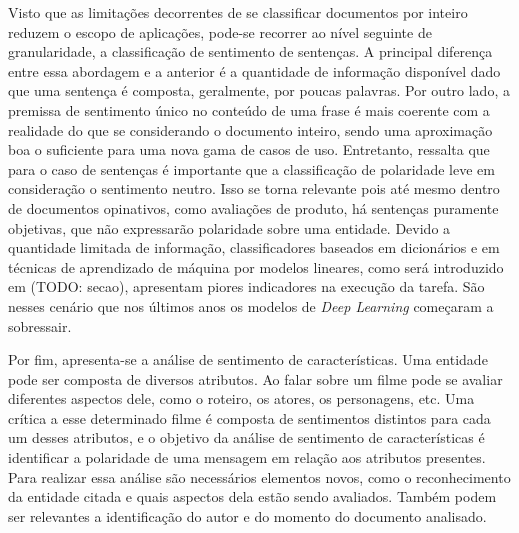 Visto que as limitações decorrentes de se classificar documentos por inteiro
reduzem o escopo de aplicações, pode-se recorrer ao nível seguinte de
granularidade, a classificação de sentimento de sentenças.
A principal diferença entre essa abordagem e a anterior é a quantidade de
informação disponível dado que uma sentença é composta, geralmente, por poucas
palavras.
Por outro lado, a premissa de sentimento único no conteúdo de uma frase é mais
coerente com a realidade do que se considerando o documento inteiro, sendo uma
aproximação boa o suficiente para uma nova gama de casos de uso.
Entretanto, \citet{liu15} ressalta que para o caso de sentenças é importante que
a classificação de polaridade leve em consideração o sentimento neutro.
Isso se torna relevante pois até mesmo dentro de documentos opinativos, como
avaliações de produto, há sentenças puramente objetivas, que não expressarão
polaridade sobre uma entidade.
Devido a quantidade limitada de informação, classificadores baseados em
dicionários e em técnicas de aprendizado de máquina por modelos lineares,
como será introduzido em (TODO: secao), apresentam piores indicadores na
execução da tarefa.
São nesses cenário que nos últimos anos os modelos de \textit{Deep Learning}
começaram a sobressair.

Por fim, apresenta-se a análise de sentimento de características.
Uma entidade pode ser composta de diversos atributos.
Ao falar sobre um filme pode se avaliar diferentes aspectos dele, como
o roteiro, os atores, os personagens, etc.
Uma crítica a esse determinado filme é composta de sentimentos distintos para
cada um desses atributos, e o objetivo da análise de sentimento de
características é identificar a polaridade de uma mensagem em relação aos
atributos presentes.
Para realizar essa análise são necessários elementos novos, como o reconhecimento
da entidade citada e quais aspectos dela estão sendo avaliados.
Também podem ser relevantes a identificação do autor e do momento do documento
analisado.



%

